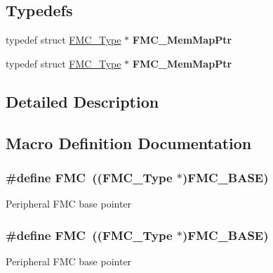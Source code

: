 \subsection*{Typedefs}
\begin{DoxyCompactItemize}
\item 
typedef struct \hyperlink{structFMC__Type}{F\+M\+C\+\_\+\+Type} $\ast$ {\bfseries F\+M\+C\+\_\+\+Mem\+Map\+Ptr}\hypertarget{group__FMC__Peripheral__Access__Layer_ga741a598985d162c64122976fd37df2a8}{}\label{group__FMC__Peripheral__Access__Layer_ga741a598985d162c64122976fd37df2a8}

\item 
typedef struct \hyperlink{structFMC__Type}{F\+M\+C\+\_\+\+Type} $\ast$ {\bfseries F\+M\+C\+\_\+\+Mem\+Map\+Ptr}\hypertarget{group__FMC__Peripheral__Access__Layer_ga741a598985d162c64122976fd37df2a8}{}\label{group__FMC__Peripheral__Access__Layer_ga741a598985d162c64122976fd37df2a8}

\end{DoxyCompactItemize}


\subsection{Detailed Description}


\subsection{Macro Definition Documentation}
\subsubsection[{\texorpdfstring{F\+MC}{FMC}}]{\setlength{\rightskip}{0pt plus 5cm}\#define F\+MC~(({\bf F\+M\+C\+\_\+\+Type} $\ast$){\bf F\+M\+C\+\_\+\+B\+A\+SE})}\hypertarget{group__FMC__Peripheral__Access__Layer_ga970254e6dadedc433f57d43709636664}{}\label{group__FMC__Peripheral__Access__Layer_ga970254e6dadedc433f57d43709636664}
Peripheral F\+MC base pointer 
\subsubsection[{\texorpdfstring{F\+MC}{FMC}}]{\setlength{\rightskip}{0pt plus 5cm}\#define F\+MC~(({\bf F\+M\+C\+\_\+\+Type} $\ast$){\bf F\+M\+C\+\_\+\+B\+A\+SE})}\hypertarget{group__FMC__Peripheral__Access__Layer_ga970254e6dadedc433f57d43709636664}{}\label{group__FMC__Peripheral__Access__Layer_ga970254e6dadedc433f57d43709636664}
Peripheral F\+MC base pointer 
